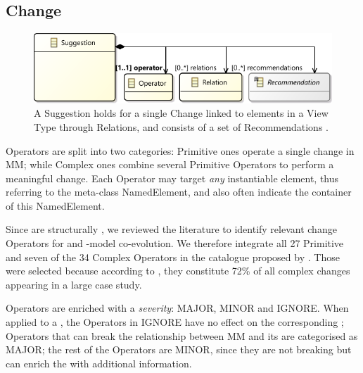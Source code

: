 \subsection{Change}
\label{sec:Suggestion:Change}

\begin{figure}[t]
    \centering
    \includegraphics[width=\columnwidth]{images/Suggestion.pdf}
    \caption{A \textsf{Suggestion} holds for a single \textsf{Change} linked to 
		elements in a View Type through \textsf{Relation}s, and consists of a set of \textsf{Recommendation}s .}
    \label{fig:Suggestion}
\end{figure}

\textsf{Operator}s are split into two categories:
\textsf{Primitive} ones operate a single change in \textsf{MM}; while
\textsf{Complex} ones combine several \textsf{Primitive} \textsf{Operator}s
to perform a meaningful change. 
Each \textsf{Operator} may target \emph{any} instantiable \metamodel element, 
thus referring to the meta-class \textsf{NamedElement}, and also often
indicate the \textsf{container} of this \textsf{NamedElement}.

Since \viewtypes are structurally \metamodels, we reviewed the literature to
identify relevant change \textsf{Operator}s for \metamodels and 
\metamodel{}-model co-evolution. 
We therefore integrate all 27 \textsf{Primitive} and seven of the 34 
\textsf{Complex} \textsf{Operator}s in the catalogue proposed by 
\textcite{herrmannsdoerfer_extensive_2011}.
Those were selected because according to \textcite{khelladi_detecting_2015}, 
they constitute 72\% of all complex changes appearing in a large case study. 

\textsf{Operator}s are enriched with a \emph{severity}: \textsf{MAJOR}, 
\textsf{MINOR} and \textsf{IGNORE}. 
When applied to a \metamodel, the \textsf{Operator}s in \textsf{IGNORE} have no 
effect on the corresponding \viewtypes; \textsf{Operator}s that can break the 
relationship between \textsf{MM} and its \viewtypes are categorised as \textsf{MAJOR}; 
the rest of the \textsf{Operator}s are \textsf{MINOR}, since they are not 
breaking but can enrich the \viewtypes with additional information.
 

